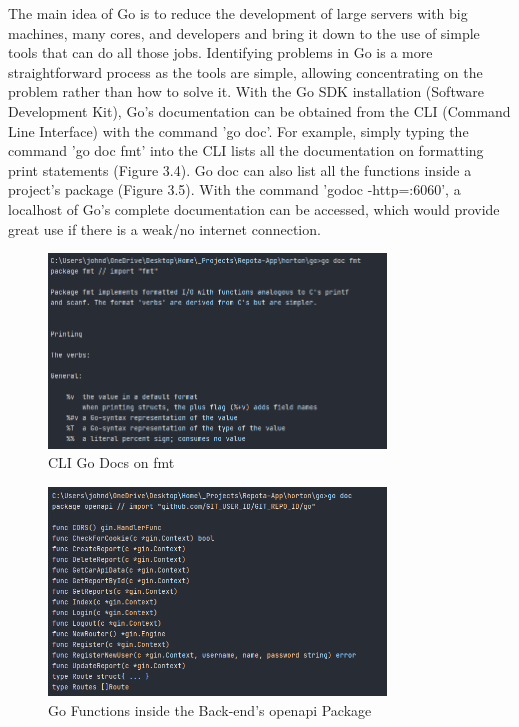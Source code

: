 The main idea of Go is to reduce the development of large servers with big machines, many cores, and developers and bring it down to the use of simple tools that can do all those jobs. \cite{ref10} Identifying problems in Go is a more straightforward process as the tools are simple, allowing concentrating on the problem rather than how to solve it. With the Go SDK installation (Software Development Kit), Go's documentation can be obtained from the CLI (Command Line Interface) with the command 'go doc'. For example, simply typing the command 'go doc fmt' into the CLI lists all the documentation on formatting print statements (Figure 3.4). Go doc can also list all the functions inside a project's package (Figure 3.5). With the command 'godoc -http=:6060', a localhost of Go's complete documentation can be accessed, which would provide great use if there is a weak/no internet connection.

\begin{figure}[H]
    \caption{CLI Go Docs on fmt}
    \label{image:goDocFmt}
    \centering
    \includegraphics[width=0.8\textwidth]{images/misc/go-doc-fmt.png}
\end{figure}

\begin{figure}[H]
    \caption{Go Functions inside the Back-end's openapi Package}
    \label{image:goFuncs}
    \centering
    \includegraphics[width=0.8\textwidth]{images/misc/godoc-funcs.png}
\end{figure}

